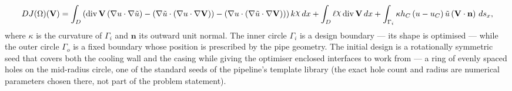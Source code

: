 \documentclass[preview]{standalone}
\let\oldcdot\cdot
\let\cdot\oldcdot
\begin{document}
\begin{dmath*}
DJ(\Omega)(\mathbf V) = \int_{D} \left(\operatorname{div} {\mathbf V} \left(  \nabla u  \cdot  \nabla \tilde u  \right) - \left(  \nabla \tilde u  \cdot \left(  \nabla u  \cdot  \nabla {\mathbf V}  \right) \right) - \left(  \nabla u  \cdot \left(  \nabla \tilde u  \cdot  \nabla {\mathbf V}  \right) \right)\right) k \raisebox{\depth}{$\chi$} \,dx + \int_{D} \ell \raisebox{\depth}{$\chi$} \operatorname{div} {\mathbf V} \,dx + \int_{\Gamma_i} \kappa h_C \left( u - u_{C}\right) \tilde u \left(\mathbf V \cdot \mathbf n\right) \,ds_x ,
\end{dmath*}
where $\kappa$ is the curvature of $\Gamma_i$ and $\mathbf n$ its outward unit normal.  The inner circle $\Gamma_i$ is a design boundary — its shape is optimised — while the outer circle $\Gamma_o$ is a fixed boundary whose position is prescribed by the pipe geometry.
The initial design is a rotationally symmetric seed that covers both the cooling wall and the casing while giving the optimiser enclosed interfaces to work from — a ring of evenly spaced holes on the mid-radius circle, one of the standard seeds of the pipeline's template library (the exact hole count and radius are numerical parameters chosen there, not part of the problem statement).
\end{document}

